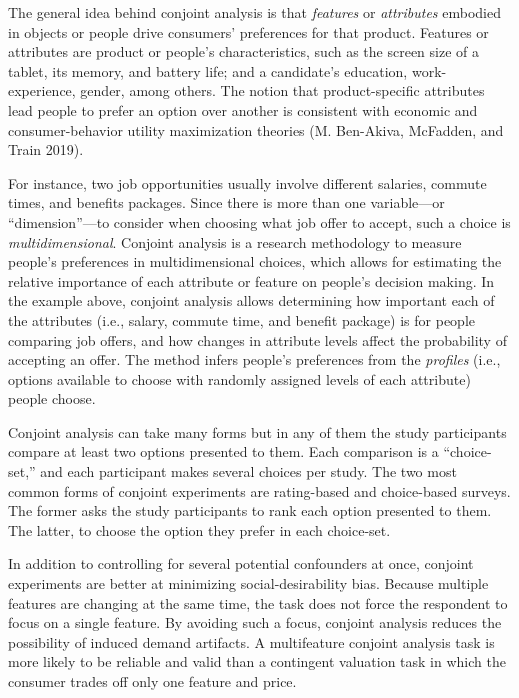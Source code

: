 \documentclass[
  12pt,
]{article}
\begin{document}
The general idea behind conjoint analysis is that \emph{features} or \emph{attributes} embodied in objects or people drive consumers' preferences for that product. Features or attributes are product or people's characteristics, such as the screen size of a tablet, its memory, and battery life; and a candidate's education, work-experience, gender, among others. The notion that product-specific attributes lead people to prefer an option over another is consistent with economic and consumer-behavior utility maximization theories (M. Ben-Akiva, McFadden, and Train 2019).

For instance, two job opportunities usually involve different salaries, commute times, and benefits packages. Since there is more than one variable---or ``dimension''---to consider when choosing what job offer to accept, such a choice is \emph{multidimensional}. Conjoint analysis is a research methodology to measure people's preferences in multidimensional choices, which allows for estimating the relative importance of each attribute or feature on people's decision making. In the example above, conjoint analysis allows determining how important each of the attributes (i.e., salary, commute time, and benefit package) is for people comparing job offers, and how changes in attribute levels affect the probability of accepting an offer. The method infers people's preferences from the \emph{profiles} (i.e., options available to choose with randomly assigned levels of each attribute) people choose.

Conjoint analysis can take many forms but in any of them the study participants compare at least two options presented to them. Each comparison is a ``choice-set,'' and each participant makes several choices per study. The two most common forms of conjoint experiments are rating-based and choice-based surveys. The former asks the study participants to rank each option presented to them. The latter, to choose the option they prefer in each choice-set.

In addition to controlling for several potential confounders at once, conjoint experiments are better at minimizing social-desirability bias. Because multiple features are changing at the same time, the task does not force the respondent to focus on a single feature. By avoiding such a focus, conjoint analysis reduces the possibility of induced demand artifacts. A multifeature conjoint analysis task is more likely to be reliable and valid than a contingent valuation task in which the consumer trades off only one feature and price.
\end{document}
